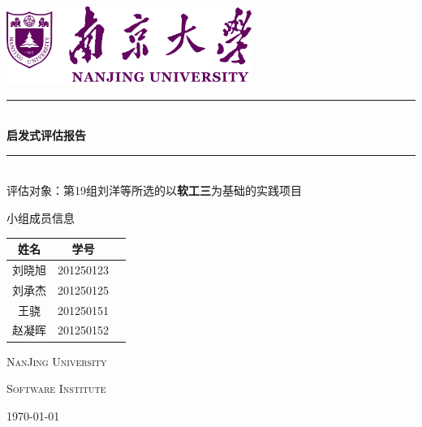 \begin{titlepage}
	\newcommand{\HRule}{\rule{\linewidth}{0.5mm}}
    \center 
	\includegraphics[width=0.6\textwidth]{images/校标，中、英文校名组合.jpg}\\[1cm]  %

    \HRule \\[0.5cm]
	{ \textbf{启发式评估报告}}
    \HRule \\[0.5cm]

    \vspace{10pt}
    {  评估对象：第19组刘洋等所选的以\textbf{软工三}为基础的实践项目}


    \vspace{2cm}

  
    { \kaishu 小组成员信息}
    \vspace{-0.3cm}
    {\begin{center}
        \begin{table}[H]
            \setlength{\tabcolsep}{7mm}
            \centering
            \begin{tabular}{|c|c|c|}
            \hline
            姓名  & 学号        \\ \hline
            刘晓旭 & 201250123  \\ \hline
            刘承杰 & 201250125  \\ \hline
            王骁  & 201250151  \\ \hline
            赵凝晖 & 201250152 \\ \hline
            \end{tabular}
        \end{table}
    \end{center}}

    \vspace{1.5cm}


    \vfill

    {
    \textsc{NanJing University}
    
    \vspace{3pt}
    \textsc{Software Institute}}

    \vspace{0.5cm}
	{ \today}\\[1cm] 
\end{titlepage}
